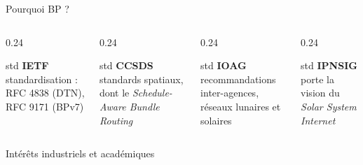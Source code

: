 \documentclass[aspectratio=169,10pt]{beamer}
\begin{document}
\begin{frame}{Pourquoi BP ?}

\vfill
{}

\vspace{6pt}
\begin{columns}[T]
\begin{column}{0.24\textwidth}
\begin{smallcard}{std}\centering
{\bfseries IETF}\\[3pt]
{\footnotesize\color{inkdim} standardisation : RFC 4838 (DTN), RFC 9171 (BPv7)}
\end{smallcard}
\end{column}
\begin{column}{0.24\textwidth}
\begin{smallcard}{std}\centering
{\bfseries CCSDS}\\[3pt]
{\footnotesize\color{inkdim} standards spatiaux, dont le \emph{Schedule-Aware Bundle Routing}}
\end{smallcard}
\end{column}
\begin{column}{0.24\textwidth}
\begin{smallcard}{std}\centering
{\bfseries IOAG}\\[3pt]
{\footnotesize\color{inkdim} recommandations inter-agences, réseaux lunaires et solaires}
\end{smallcard}
\end{column}
\begin{column}{0.24\textwidth}
\begin{smallcard}{std}\centering
{\bfseries IPNSIG}\\[3pt]
{\footnotesize\color{inkdim} porte la vision du \emph{Solar System Internet}}
\end{smallcard}
\end{column}
\end{columns}

\vspace{10pt}
{\footnotesize\color{inkdim} Intérêts industriels et académiques}\\[3pt]
  \\[3pt]
   
\vfill


\end{frame}
\end{document}
